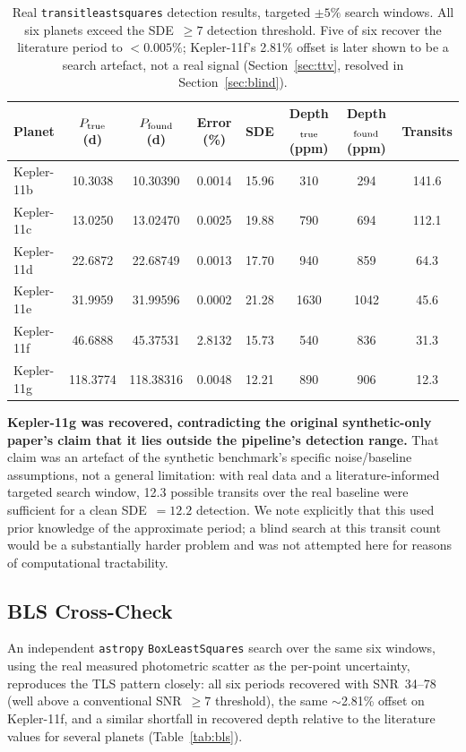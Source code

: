\documentclass[11pt]{article}
\begin{document}
\begin{table}[h]
\centering
\caption{Real \texttt{transitleastsquares} detection results, targeted $\pm5\%$ search windows. All six planets exceed the SDE~$\ge 7$ detection threshold. Five of six recover the literature period to $<0.005\%$; Kepler-11f's 2.81\% offset is later shown to be a search artefact, not a real signal (Section~\ref{sec:ttv}, resolved in Section~\ref{sec:blind}).}
\label{tab:tls}
\begin{tabular}{lccccccc}
\toprule
Planet & $P_{\rm true}$ (d) & $P_{\rm found}$ (d) & Error (\%) & SDE & Depth$_{\rm true}$ (ppm) & Depth$_{\rm found}$ (ppm) & Transits \\
\midrule
Kepler-11b & 10.3038  & 10.30390  & 0.0014 & 15.96 & 310  & 294  & 141.6 \\
Kepler-11c & 13.0250  & 13.02470  & 0.0025 & 19.88 & 790  & 694  & 112.1 \\
Kepler-11d & 22.6872  & 22.68749  & 0.0013 & 17.70 & 940  & 859  & 64.3  \\
Kepler-11e & 31.9959  & 31.99596  & 0.0002 & 21.28 & 1630 & 1042 & 45.6  \\
Kepler-11f & 46.6888  & 45.37531  & 2.8132 & 15.73 & 540  & 836  & 31.3  \\
Kepler-11g & 118.3774 & 118.38316 & 0.0048 & 12.21 & 890  & 906  & 12.3  \\
\bottomrule
\end{tabular}
\end{table}

\textbf{Kepler-11g was recovered, contradicting the original synthetic-only paper's claim that it lies outside the pipeline's detection range.} That claim was an artefact of the synthetic benchmark's specific noise/baseline assumptions, not a general limitation: with real data and a literature-informed targeted search window, 12.3 possible transits over the real baseline were sufficient for a clean SDE~$=12.2$ detection. We note explicitly that this used prior knowledge of the approximate period; a blind search at this transit count would be a substantially harder problem and was not attempted here for reasons of computational tractability.

\subsection{BLS Cross-Check}
\label{sec:bls-crosscheck}

An independent \texttt{astropy} \texttt{BoxLeastSquares} search over the same six windows, using the real measured photometric scatter as the per-point uncertainty, reproduces the TLS pattern closely: all six periods recovered with SNR~34--78 (well above a conventional SNR~$\ge7$ threshold), the same $\sim$2.81\% offset on Kepler-11f, and a similar shortfall in recovered depth relative to the literature values for several planets (Table~\ref{tab:bls}).
\end{document}
